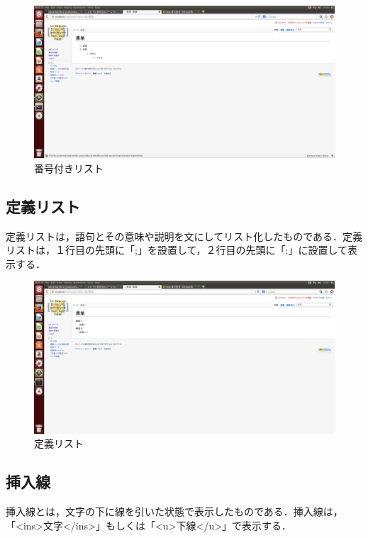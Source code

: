 \begin{figure}[htb]
\centering
\includegraphics[width=14cm]{risuto}
\caption{番号付きリスト}\label{図}
\end{figure}

\subsection{定義リスト}
定義リストは，語句とその意味や説明を文にしてリスト化したものである．定義リストは，１行目の先頭に「;」を設置して，２行目の先頭に「:」に設置して表示する．

\begin{figure}[htb]
\centering
\includegraphics[width=14cm]{teigi}
\caption{定義リスト}\label{図}
\end{figure}

\subsection{挿入線}
挿入線とは，文字の下に線を引いた状態で表示したものである．挿入線は，「<ins>文字</ins>」もしくは「<u>下線</u>」で表示する．


